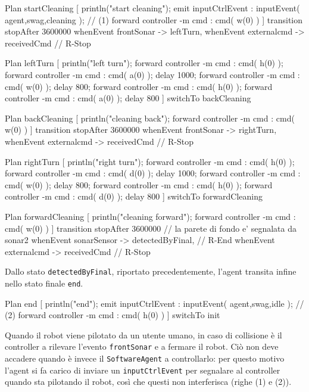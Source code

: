 \documentclass{../llncs}
\newcommand{\codescript}[1]{{\mbox{\small{\texttt{#1}}}}\xspace}
\begin{document}
\begin{qacode}[caption={SoftwareAgent, pt5}]
Plan startCleaning [
	println("start cleaning");
	emit inputCtrlEvent : inputEvent( agent,swag,cleaning ); // (1)
	forward controller -m cmd : cmd( w(0) )
]
transition stopAfter 3600000
	whenEvent frontSonar -> leftTurn,
	whenEvent externalcmd -> receivedCmd // R-Stop
	
Plan leftTurn [
	println("left turn");	
	forward controller -m cmd : cmd( h(0) );
	forward controller -m cmd : cmd( a(0) );
	delay 1000;
	forward controller -m cmd : cmd( w(0) );
	delay 800;
	forward controller -m cmd : cmd( h(0) );
	forward controller -m cmd : cmd( a(0) );
	delay 800
]
switchTo backCleaning

Plan backCleaning [
	println("cleaning back");
	forward controller -m cmd : cmd( w(0) )
]
transition stopAfter 3600000
	whenEvent frontSonar -> rightTurn,
	whenEvent externalcmd -> receivedCmd // R-Stop
	
Plan rightTurn [
	println("right turn");
	forward controller -m cmd : cmd( h(0) );
	forward controller -m cmd : cmd( d(0) );
	delay 1000;
	forward controller -m cmd : cmd( w(0) );
	delay 800;
	forward controller -m cmd : cmd( h(0) );
	forward controller -m cmd : cmd( d(0) );
	delay 800
]
switchTo forwardCleaning

Plan forwardCleaning [
	println("cleaning forward");
	forward controller -m cmd : cmd( w(0) )
]
transition stopAfter 3600000
	// la parete di fondo e' segnalata da sonar2
	whenEvent sonarSensor -> detectedByFinal, // R-End
	whenEvent externalcmd -> receivedCmd // R-Stop
\end{qacode}

Dallo stato \codescript{detectedByFinal}, riportato precedentemente, l'agent transita infine nello stato finale \codescript{end}.\\

\begin{qacode}[caption={SoftwareAgent, pt5}]
Plan end [
	println("end");
	emit inputCtrlEvent : inputEvent( agent,swag,idle ); // (2)
	forward controller -m cmd : cmd( h(0) )
]
switchTo init
\end{qacode}

Quando il robot viene pilotato da un utente umano, in caso di collisione è il controller a rilevare l'evento \codescript{frontSonar} e a fermare il robot. Ciò non deve accadere quando è invece il \texttt{SoftwareAgent} a controllarlo: per questo motivo l'agent si fa carico di inviare un \codescript{inputCtrlEvent} per segnalare al controller quando sta pilotando il robot, così che questi non interferisca (righe (1) e (2)).
\end{document}
